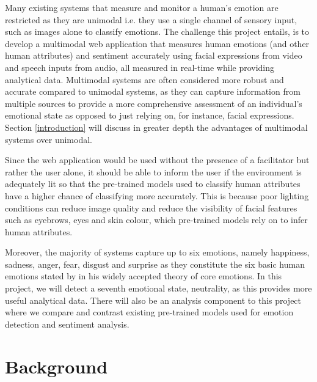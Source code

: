 \documentclass[12pt, a4paper]{article}
\newcommand{\np}
    {
    \vskip 0.4cm
    }
\begin{document}
Many existing systems that measure and monitor a human's emotion are restricted as they are unimodal i.e. they use a single channel of sensory input, such as images alone to classify emotions. The challenge this project entails, is to develop a multimodal web application that measures human emotions (and other human attributes) and sentiment accurately using facial expressions from video and speech inputs from audio, all measured in real-time while providing analytical data. Multimodal systems are often considered more robust \citep{poria2017review, garcia2018multimodal} and accurate compared to unimodal systems, as they can capture information from multiple sources to provide a more comprehensive assessment of an individual's emotional state as opposed to just relying on, for instance, facial expressions. Section \ref{introduction} will discuss in greater depth the advantages of multimodal systems over unimodal.
\np
Since the web application would be used without the presence of a facilitator but rather the user alone, it should be able to inform the user if the environment is adequately lit so that the pre-trained models used to classify human attributes have a higher chance of classifying more accurately. This is because poor lighting conditions can reduce image quality and reduce the visibility of facial features such as eyebrows, eyes and skin colour, which pre-trained models rely on to infer human attributes.
\np
Moreover, the majority of systems capture up to six emotions, namely happiness, sadness, anger, fear, disgust and surprise as they constitute the six basic human emotions stated by \cite{ekman} in his widely accepted theory of core emotions. In this project, we will detect a seventh emotional state, neutrality, as this provides more useful analytical data. There will also be an analysis component to this project where we compare and contrast existing pre-trained models used for emotion detection and sentiment analysis.

\clearpage
\section{Background}
\end{document}
